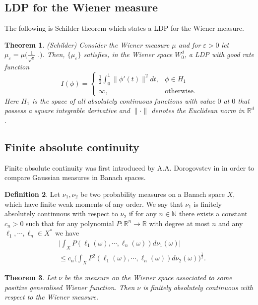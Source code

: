 \documentclass[]{interact}
\newcommand{\R}{{\mathbb{R}}}
\newcommand{\1}{\mathbf{1}}
\newcommand{\N}{{\mathbb N}}
\theoremstyle{plain}%
\newtheorem{thm}{Theorem}[section]
\theoremstyle{definition}
\newtheorem{defn}[thm]{Definition}
\theoremstyle{remark}
\begin{document}
\subsection{LDP for the Wiener measure} \label{App2}
The following is Schilder theorem which states a LDP for the Wiener measure.
\begin{thm}(Schilder)\cite[Theorem 5.2.3]{DZ09} \label{Schilder}
Consider the Wiener measure $\mu$ and for $\varepsilon >0$ let $\mu _\varepsilon =\mu \Big( \frac{1}{\sqrt{\varepsilon} } \;. \Big) $. Then, $\{\mu_\varepsilon \}$ satisfies, in the Wiener space $W_0^d$, a LDP with good rate function 
$$ I(\phi)=\begin{cases}
\frac{1}{2} \int _0^1 \|\phi '(t)\|^2dt, & \phi \in H_1\\
\infty ,& \text{otherwise}.\end{cases}  $$ 
Here $H_1$ is the space of all absolutely continuous functions with value $0$ at $0$ that possess a square integrable derivative and $ \|\cdot \| $ denotes the Euclidean norm in $\R^d$.
\end{thm}
\subsection{Finite absolute continuity} \label{FAC}
Finite absolute continuity was first introduced by A.A. Dorogovstev in \cite{Dor00} in order to compare Gaussian measures in Banach spaces.
\begin{defn}\cite[Definition 2]{Dor00}
Let $\nu_1, \nu_2$ be two probability measures on a Banach space $X$, which have finite weak moments of any order. We say that $\nu_1$ is finitely absolutely continuous with respect to $\nu_2$ if for any $n\in \N$ there exists a constant $c_n>0$ such that for any polynomial $P : \R^n\to \R$ with degree at most $n$ and any $\ell_1,\cdots, \ell_n \in X^*$ we have 
\begin{align*}
& \Big| \int _{ X } P ( \ell_1(\omega),\cdots , \ell_n (\omega) ) d\nu_1(\omega) \Big| \\
& \leqslant c_n \Big(  \int _{ X } P^2 ( \ell_1(\omega),\cdots, \ell_n (\omega) ) d\nu_2(\omega) \Big) ^{\frac{1}{2} }. 
\end{align*} 
\end{defn}

\begin{thm}\cite[Proposition 1]{Riabov11} \label{Ryabov}
Let $\nu $ be the measure on the Wiener space associated to some positive generalised Wiener function. Then $\nu$ is finitely absolutely continuous with respect to the Wiener measure.
\end{thm}
\end{document}

